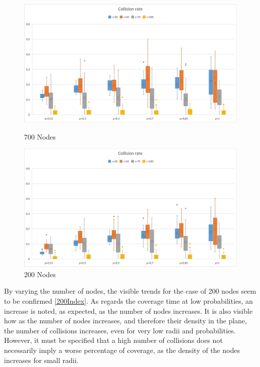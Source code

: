 \begin{figure}[H]
  \includegraphics[width=\linewidth]{./images/Collision700Boxplot.png}
  \caption{700 Nodes}\label{fig:awesome_image1}
\endminipage\hfill
{}
  \includegraphics[width=\linewidth]{./images/Collision200BoxplotScaled.png}
  \caption{200 Nodes}\label{fig:awesome_image2}
\endminipage
\end{figure}

By varying the number of nodes, the visible trends for the case of 200 nodes seem to be confirmed \ref{200Index}. As regards the coverage time at low probabilities, an increase is noted, as expected, as the number of nodes increases. It is also visible how as the number of nodes increases, and therefore their density in the plane, the number of collisions increases, even for very low radii and probabilities. However, it must be specified that a high number of collisions does not necessarily imply a worse percentage of coverage, as the density of the nodes increases for small radii.